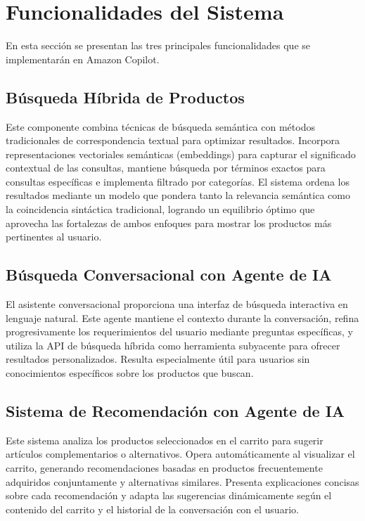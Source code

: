 \section{Funcionalidades del Sistema}

En esta sección se presentan las tres principales funcionalidades que se implementarán en Amazon Copilot.

\subsection{Búsqueda Híbrida de Productos}

Este componente combina técnicas de búsqueda semántica con métodos tradicionales de correspondencia textual para optimizar resultados. Incorpora representaciones vectoriales semánticas (embeddings) para capturar el significado contextual de las consultas, mantiene búsqueda por términos exactos para consultas específicas e implementa filtrado por categorías. El sistema ordena los resultados mediante un modelo que pondera tanto la relevancia semántica como la coincidencia sintáctica tradicional, logrando un equilibrio óptimo que aprovecha las fortalezas de ambos enfoques para mostrar los productos más pertinentes al usuario.

\subsection{Búsqueda Conversacional con Agente de IA}

El asistente conversacional proporciona una interfaz de búsqueda interactiva en lenguaje natural. Este agente mantiene el contexto durante la conversación, refina progresivamente los requerimientos del usuario mediante preguntas específicas, y utiliza la API de búsqueda híbrida como herramienta subyacente para ofrecer resultados personalizados. Resulta especialmente útil para usuarios sin conocimientos específicos sobre los productos que buscan.

\subsection{Sistema de Recomendación con Agente de IA}

Este sistema analiza los productos seleccionados en el carrito para sugerir artículos complementarios o alternativos. Opera automáticamente al visualizar el carrito, generando recomendaciones basadas en productos frecuentemente adquiridos conjuntamente y alternativas similares. Presenta explicaciones concisas sobre cada recomendación y adapta las sugerencias dinámicamente según el contenido del carrito y el historial de la conversación con el usuario.
